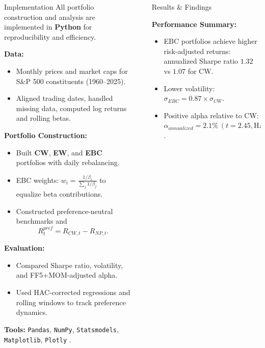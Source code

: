 \documentclass[final]{beamer}
\newlength{\sepwidth}
\newlength{\colwidth}
\newcommand{\separatorcolumn}{\begin{column}{\sepwidth}\end{column}}
\begin{document}
\begin{frame}[t]
\begin{columns}[t]
\begin{column}{\colwidth}
\begin{block}{Implementation}
All portfolio construction and analysis are implemented in \textbf{Python} 
for reproducibility and efficiency.

\textbf{Data:}
\begin{itemize}
  \item Monthly prices and market caps for S\&P 500 constituents (1960–2025).
  \item Aligned trading dates, handled missing data, computed log returns and rolling betas.
\end{itemize}

\textbf{Portfolio Construction:}
\begin{itemize}
  \item Built \textbf{CW}, \textbf{EW}, and \textbf{EBC} portfolios with daily rebalancing.
  \item EBC weights: \( w_i = \frac{1/\beta_i}{\sum_j 1/\beta_j} \) to equalize beta contributions.
  \item Constructed preference-neutral benchmarks and 
  \[
  R^{pref}_t = R_{CW,t} - R_{NP,t}.
  \]
\end{itemize}

\textbf{Evaluation:}
\begin{itemize}
  \item Compared Sharpe ratio, volatility, and FF5+MOM-adjusted alpha.
  \item Used HAC-corrected regressions and rolling windows to track preference dynamics.
\end{itemize}

\textbf{Tools:}
\texttt{Pandas}, \texttt{NumPy}, \texttt{Statsmodels}, \texttt{Matplotlib}, \texttt{Plotly} .
\end{block}


\end{column}
\separatorcolumn

\begin{column}{\colwidth}

\begin{block}{Results \& Findings}

\textbf{Performance Summary:}
\begin{itemize}
  \item EBC portfolios achieve higher risk-adjusted returns:
  annualized Sharpe ratio \(1.32\) vs \(1.07\) for CW.
  \item Lower volatility: \(\sigma_{EBC} = 0.87 \times \sigma_{CW}\).
  \item Positive alpha relative to CW:
  \(\alpha_{annualized} = 2.1\% \ (t = 2.45, \text{HAC-corrected})\).
\end{itemize}


\end{block}
\end{column}
\end{columns}
\end{frame}
\end{document}
